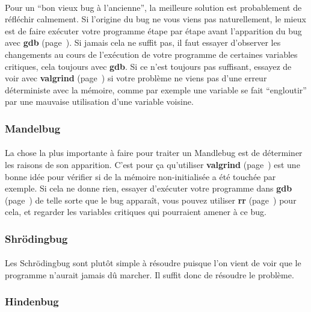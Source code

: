 \paragraph{} Pour un ``bon vieux bug à l'ancienne'', la meilleure solution est
probablement de réfléchir calmement. Si l'origine du bug ne vous viens pas
naturellement, le mieux est de faire exécuter votre programme étape par étape
avant l'apparition du bug avec \textbf{gdb} (page~\pageref{part:gdb}). Si
jamais cela ne suffit pas, il faut essayer d'observer les changements au cours
de l'exécution de votre programme de certaines variables critiques, cela
toujours avec \textbf{gdb}. Si ce n'est toujours pas suffisant, essayez de voir
avec \textbf{valgrind} (page~\pageref{part:valgrind}) si votre problème ne
viens pas d'une erreur déterministe avec la mémoire, comme par exemple une
variable se fait ``engloutir'' par une mauvaise utilisation d'une variable
voisine.

\subsubsection{Mandelbug}

\paragraph{} La chose la plus importante à faire pour traiter un Mandlebug est
de déterminer les raisons de son apparition. C'est pour ça qu'utiliser
\textbf{valgrind} (page~\pageref{part:valgrind}) est une bonne idée pour
vérifier si de la mémoire non-initialisée a été touchée par exemple. Si cela ne
donne rien, essayer d'exécuter votre programme dans \textbf{gdb}
(page~\pageref{part:gdb}) de telle sorte que le bug apparaît, vous pouvez
utiliser \textbf{rr} (page~\pageref{part:rr}) pour cela, et regarder les
variables critiques qui pourraient amener à ce bug.


\subsubsection{Shrödingbug}

\paragraph{} Les Schrödingbug sont plutôt simple à résoudre puisque l'on vient
de voir que le programme n'aurait jamais dû marcher. Il suffit donc de résoudre
le problème.

\subsubsection{Hindenbug}

